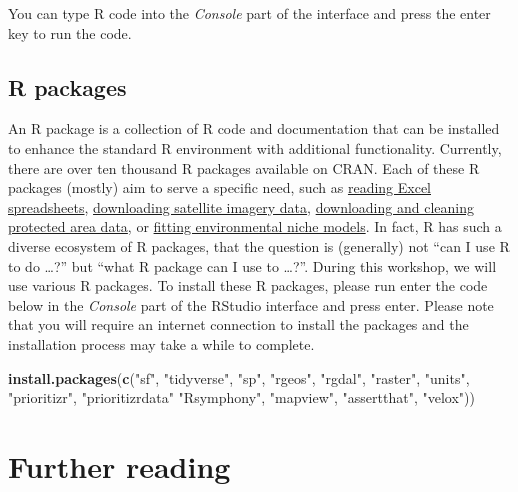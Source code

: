\documentclass[12pt,]{book}
\newenvironment{Shaded}{\begin{snugshade}}{\end{snugshade}}
\newcommand{\KeywordTok}[1]{\textcolor[rgb]{0.13,0.29,0.53}{\textbf{#1}}}
\newcommand{\StringTok}[1]{\textcolor[rgb]{0.31,0.60,0.02}{#1}}
\newcommand{\NormalTok}[1]{#1}
\begin{document}
You can type R code into the \emph{Console} part of the interface and
press the enter key to run the code.

\subsection{R packages}\label{r-packages}

An R package is a collection of R code and documentation that can be
installed to enhance the standard R environment with additional
functionality. Currently, there are over ten thousand R packages
available on CRAN. Each of these R packages (mostly) aim to serve a
specific need, such as
\href{https://cran.r-project.org/web/packages/readxl/index.html}{reading
Excel spreadsheets},
\href{https://cran.r-project.org/web/packages/MODIStsp/index.html}{downloading
satellite imagery data},
\href{https://cran.r-project.org/web/packages/wdpar/index.html}{downloading
and cleaning protected area data}, or
\href{https://cran.r-project.org/web/packages/ENMeval/index.html}{fitting
environmental niche models}. In fact, R has such a diverse ecosystem of
R packages, that the question is (generally) not ``can I use R to do
\ldots{}?'' but ``what R package can I use to \ldots{}?''. During this
workshop, we will use various R packages. To install these R packages,
please run enter the code below in the \emph{Console} part of the
RStudio interface and press enter. Please note that you will require an
internet connection to install the packages and the installation process
may take a while to complete.

\begin{Shaded}
\begin{Highlighting}[]
\KeywordTok{install.packages}\NormalTok{(}\KeywordTok{c}\NormalTok{(}\StringTok{"sf"}\NormalTok{, }\StringTok{"tidyverse"}\NormalTok{, }\StringTok{"sp"}\NormalTok{, }\StringTok{"rgeos"}\NormalTok{, }\StringTok{"rgdal"}\NormalTok{, }\StringTok{"raster"}\NormalTok{, }\StringTok{"units"}\NormalTok{,}
                   \StringTok{"prioritizr"}\NormalTok{, }\StringTok{"prioritizrdata"} \StringTok{"Rsymphony"}\NormalTok{, }\StringTok{"mapview"}\NormalTok{,}
                   \StringTok{"assertthat"}\NormalTok{, }\StringTok{"velox"}\NormalTok{))}
\end{Highlighting}
\end{Shaded}

\section{Further reading}\label{further-reading}
\end{document}
